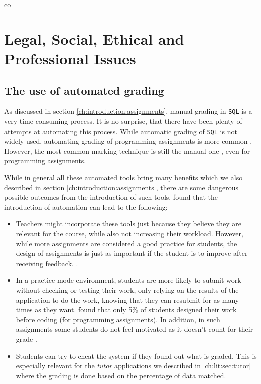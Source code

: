 co\chapter{Legal, Social, Ethical and Professional Issues}

\section{The use of automated grading}

As discussed in section \ref{ch:introduction:assignments}, manual grading in \texttt{SQL} is a very time-consuming process. It is no surprise, that there have been plenty of attempts at automating this process. While automatic grading of \texttt{SQL} is not widely used, automating grading of programming assignments is more common \citep{literature:assesment:automated:survey}. However, the most common marking technique is still the manual one \citep{literature:assesment:automated:survey}, even for programming assignments.

While in general all these automated tools bring many benefits which we also described in section \ref{ch:introduction:assignments}, there are some dangerous possible outcomes from the introduction of such tools. \cite{literature:assesment:automated:survey} found that the introduction of automation can lead to the following:
\begin{itemize}
    \item Teachers might incorporate these tools just because they believe they are relevant for the course, while also not increasing their workload. However, while more assignments are considered a good practice for students, the design of assignments is just as important if the student is to improve after receiving feedback. \citep{literature:assesment:automated:survey, literature:assement}.
    \item In a practice mode environment, students are more likely to submit work without checking or testing their work, only relying on the results of the application to do the work, knowing that they can resubmit for as many times as they want. \cite{literature:assesment:automated:survey} found that only 5\% of students designed their work before coding (for programming assignments). In addition, in such assignments some students do not feel motivated as it doesn't count for their grade \citep{literature:activesql}.
    \item Students can try to cheat the system if they found out what is graded. This is especially relevant for the \textit{tutor} applications we described in \ref{ch:lit:sec:tutor} where the grading is done based on the percentage of data matched.
\end{itemize}

